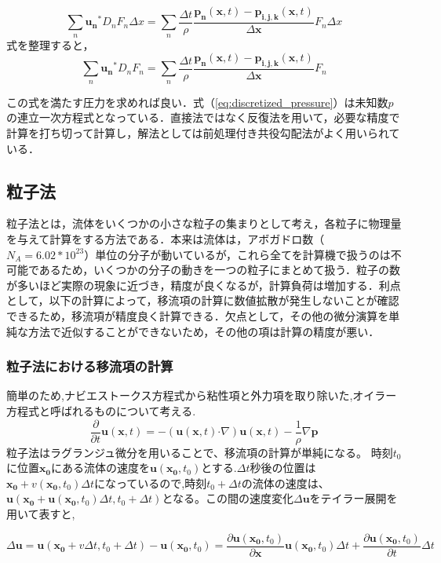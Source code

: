 \documentclass[a4j,12pt]{jreport}
\begin{document}
$$ \sum_{n}\bm{u_n}^*D_nF_n\Delta x = \sum_{n}\frac{\Delta t}{\rho}\frac{\bm{p_n}(\bm{x},t) - \bm{p_{i,j,k}}(\bm{x},t)}{\Delta \bm{x}}F_n\Delta x $$
式を整理すると，
\begin{equation}\label{eq:discretized_pressure}
\sum_{n}\bm{u_n}^*D_nF_n= \sum_{n}\frac{\Delta t}{\rho}\frac{\bm{p_n}(\bm{x},t) - \bm{p_{i,j,k}}(\bm{x},t)}{\Delta \bm{x}}F_n
\end{equation} 

この式を満たす圧力を求めれば良い．式（\ref{eq:discretized_pressure}）は未知数$p$の連立一次方程式となっている．直接法ではなく反復法を用いて，必要な精度で計算を打ち切って計算し，解法としては前処理付き共役勾配法がよく用いられている．

\subsection{粒子法} \label{subsec:particle}
粒子法とは，流体をいくつかの小さな粒子の集まりとして考え，各粒子に物理量を与えて計算をする方法である．本来は流体は，アボガドロ数（$N_A = 6.02*10^{23}$）単位の分子が動いているが，これら全てを計算機で扱うのは不可能であるため，いくつかの分子の動きを一つの粒子にまとめて扱う．粒子の数が多いほど実際の現象に近づき，精度が良くなるが，計算負荷は増加する．利点として，以下の計算によって，移流項の計算に数値拡散が発生しないことが確認できるため，移流項が精度良く計算できる．欠点として，その他の微分演算を単純な方法で近似することができないため，その他の項は計算の精度が悪い．
\subsubsection{粒子法における移流項の計算} \label{subsec:particleadvect}
簡単のため,ナビエストークス方程式から粘性項と外力項を取り除いた,オイラー方程式と呼ばれるものについて考える.
$$\frac{\partial}{\partial t}\bm{u}(\bm{x},t) = -(\bm{u}(\bm{x},t)\boldsymbol{\cdot}\nabla)\bm{u}(\bm{x},t) - \frac{1}{\rho}\nabla \bm{p}$$
粒子法はラグランジュ微分を用いることで、移流項の計算が単純になる。
時刻$t_0$に位置$\bm{x_0}$にある流体の速度を$\bm{u}(\bm{x_0},t_0)$とする.$\Delta t$秒後の位置は$\bm{x_0}+v(\bm{x_0},t_0)\Delta t$になっているので,時刻$t_0+\Delta t$の流体の速度は、$\bm{u}(\bm{x_0}+\bm{u}(\bm{x_0},t_0)\Delta t,t_0+\Delta t)$となる。この間の速度変化$\Delta \bm{u}$をテイラー展開を用いて表すと,

$$ \Delta \bm{u} = \bm{u}(\bm{x_0}+v\Delta t,t_0+\Delta t) - \bm{u}(\bm{x_0},t_0) = \frac{\partial \bm{u}(\bm{x_0},t_0)}{\partial \bm{x}}\bm{u}(\bm{x_0},t_0)\Delta t + \frac{\partial \bm{u}(\bm{x_0},t_0)}{\partial t}\Delta t$$
\end{document}
